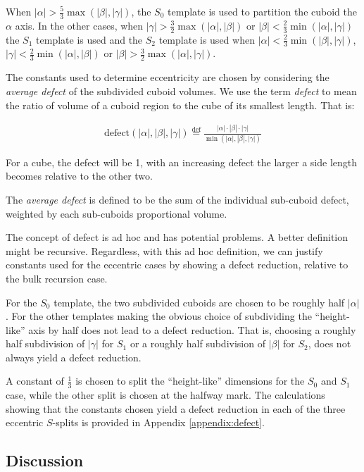 When $|\alpha| > \frac{5}{3} \max(|\beta|, |\gamma|)$, the $S_0$ template is used to partition the cuboid the $\alpha$ axis.
In the other cases, when $|\gamma| > \frac{3}{2} \max(|\alpha|, |\beta|)$ or $|\beta| < \frac{2}{3} \min(|\alpha|, |\gamma|)$ the $S_1$
template is used and the $S_2$ template is used when
$|\alpha| < \frac{2}{3} \min(|\beta|, |\gamma|)$,
$|\gamma| < \frac{2}{3} \min(|\alpha|, |\beta|)$ or
$|\beta| > \frac{3}{2} \max(|\alpha|, |\gamma|)$.

The constants used to determine eccentricity are chosen by considering the \textit{average defect} of the subdivided cuboid volumes.
We use the term \textit{defect} to mean the ratio of volume of a cuboid region to the cube of its smallest length.
That is:

$$
\begin{array}{l}
  \text{defect}(|\alpha|, |\beta|, |\gamma|) \overset{\mathrm{def}}{=} \frac{ |\alpha| \cdot |\beta| \cdot |\gamma| }{ \min(|\alpha|, |\beta|, |\gamma|) }
\end{array}
$$

For a cube, the defect will be 1, with an increasing defect the larger a side length becomes relative to the other two.

The \textit{average defect} is defined to be the sum of the individual sub-cuboid defect, weighted by each sub-cuboids proportional
volume.

The concept of defect is ad hoc and has potential problems. A better definition might be recursive.
Regardless, with this ad hoc definition, we can justify constants used for the eccentric cases by showing a defect reduction, relative
to the bulk recursion case.

For the $S_0$ template, the two subdivided cuboids are chosen to be roughly half $|\alpha|$.
For the other templates making the obvious choice of subdividing the ``height-like'' axis by half does
not lead to a defect reduction.
That is, choosing a roughly half subdivision of $|\gamma|$ for $S_1$ or a roughly half subdivision of $|\beta|$ for $S_2$, does
not always yield a defect reduction.

A constant of $\frac{1}{3}$ is chosen to split the ``height-like'' dimensions for the $S_0$ and $S_1$ case,
while the other split is chosen at the halfway mark.
The calculations showing that the constants chosen yield a defect reduction in each of the three eccentric $S$-splits is provided in Appendix \ref{appendix:defect}.

\subsection{Discussion}

